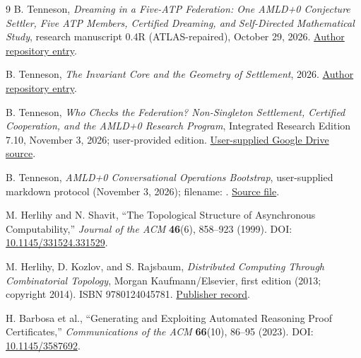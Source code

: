 \documentclass[11pt,letterpaper]{article}
\theoremstyle{definition}
\theoremstyle{remark}
\begin{document}
\begin{thebibliography}{9}
B. Tenneson, \emph{Dreaming in a Five-ATP Federation: One AMLD+0 Conjecture Settler, Five ATP Members, Certified Dreaming, and Self-Directed Mathematical Study}, research manuscript 0.4R (ATLAS-repaired), October 29, 2026.\newline
\href{https://btenneson.github.io/pub/cs.LO_Logic_in_Computer_Science/five_atp_one_amld_dreaming_0_4r_atlas_repaired/}{Author repository entry}.

B. Tenneson, \emph{The Invariant Core and the Geometry of Settlement}, 2026.\newline
\href{https://btenneson.github.io/pub/cs.LO_Logic_in_Computer_Science/invariant_core_geometry_settlement/}{Author repository entry}.

B. Tenneson, \emph{Who Checks the Federation? Non-Singleton Settlement, Certified Cooperation, and the AMLD+0 Research Program}, Integrated Research Edition 7.10, November 3, 2026; user-provided edition.\newline
\href{https://drive.google.com/file/d/14ud5bXYnV5dfWGsFjF9Byq2uKy--lA-r/view}{User-supplied Google Drive source}.

B. Tenneson, \emph{AMLD+0 Conversational Operations Bootstrap}, user-supplied markdown protocol (November 3, 2026); filename: . \href{https://drive.google.com/file/d/1CQ5Wo-TUMYcIXtmehPUFZ6zd56bDuCjQ/view}{Source file}.

M. Herlihy and N. Shavit, ``The Topological Structure of Asynchronous Computability,'' \emph{Journal of the ACM} \textbf{46}(6), 858--923 (1999). DOI: \href{https://doi.org/10.1145/331524.331529}{10.1145/331524.331529}.

M. Herlihy, D. Kozlov, and S. Rajsbaum, \emph{Distributed Computing Through Combinatorial Topology}, Morgan Kaufmann/Elsevier, first edition (2013; copyright 2014). ISBN 9780124045781. \href{https://shop.elsevier.com/books/distributed-computing-through-combinatorial-topology/herlihy/978-0-12-404578-1}{Publisher record}.

H. Barbosa et al., ``Generating and Exploiting Automated Reasoning Proof Certificates,'' \emph{Communications of the ACM} \textbf{66}(10), 86--95 (2023). DOI: \href{https://doi.org/10.1145/3587692}{10.1145/3587692}.
\end{thebibliography}
\end{document}
